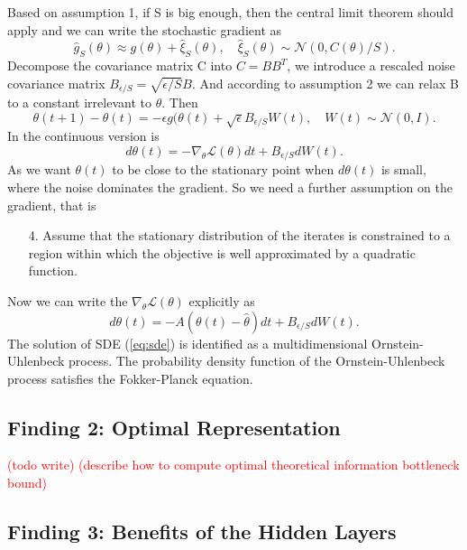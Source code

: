 \documentclass[11pt]{article}
\newcommand\myworries[1]{\textcolor{red}{(#1)}}
\begin{document}
Based on assumption 1, if S is big enough, then the central limit theorem should apply and we can write the stochastic gradient as
\begin{equation}
\hat g_S(\theta) \approx g(\theta) + \hat \xi_S(\theta), \quad \hat \xi_S(\theta)\sim \mathcal N(0,C(\theta)/S).
\end{equation}
Decompose the covariance matrix C into $C = BB^T$, we introduce a rescaled noise covariance matrix $B_{\epsilon/S} = \sqrt{\epsilon/S}B$. And according to assumption 2 we can relax B to a constant irrelevant to $\theta$.
Then 
\begin{equation}
\theta(t+1) - \theta(t) = -\epsilon g(\theta(t) + \sqrt{\epsilon} B_{\epsilon/S}W(t), \quad W(t)\sim \mathcal N(0,I).
\end{equation}
In the continuous version is 
\begin{equation}
d\theta(t) = -\nabla_\theta \mathcal L (\theta)dt + B_{\epsilon/S} dW(t).
\end{equation}
As we want $\theta(t)$ to be close to the stationary point when $d\theta(t)$ is small, where the noise dominates the gradient. So we need a further assumption on the gradient, that is 

\begin{itemize}
\item[4.] Assume that the stationary distribution of the iterates is constrained to a region within which the objective is well approximated by a quadratic function. 
\end{itemize}
Now we can write the $\nabla_\theta \mathcal L (\theta)$ explicitly as 
\begin{equation}
d\theta(t) = -A(\theta(t)-\hat \theta)dt + B_{\epsilon/S} dW(t).
\label{eq:sde}
\end{equation}
The solution of SDE (\ref{eq:sde}) is identified as a multidimensional Ornstein-Uhlenbeck process. The probability density function of the Ornstein-Uhlenbeck process satisfies the Fokker-Planck equation.

\subsection*{Finding 2: Optimal Representation}

\myworries{todo write}
\myworries{describe how to compute optimal theoretical information bottleneck bound}

\subsection*{Finding 3: Benefits of the Hidden Layers}
\end{document}
